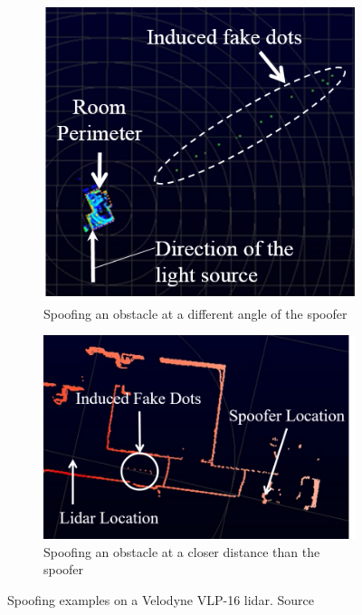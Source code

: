 \begin{figure}[H]
	\centering
	\begin{subfigure}[c]{0.4\textwidth}
	\includegraphics[width=\textwidth]{img/lidar/interference_angle_control.png}
		\caption{Spoofing an obstacle at a different angle of the spoofer}
		\label{fig:shinInterferenceAngle}
	\end{subfigure}
	\quad
	\begin{subfigure}[c]{0.55\textwidth}
		\includegraphics[width=\textwidth]{img/lidar/interference_distance_control.png}
		\caption{Spoofing an obstacle at a closer distance than the spoofer}
		\label{fig:shinInterferenceDistance}
	\end{subfigure}
	\caption{Spoofing examples on a Velodyne VLP-16 \ac{lidar}. Source~\cite{Shin2017}}
	\label{fig:shinInterference}
\end{figure}


